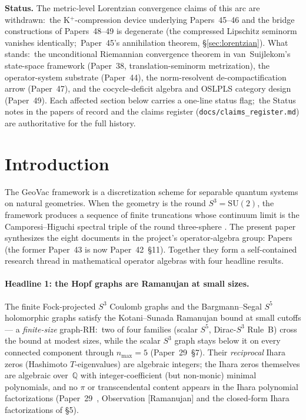 \documentclass[11pt,a4paper]{article}
\theoremstyle{plain}
\theoremstyle{definition}
\newcommand{\nmax}{n_{\max}}
\newcommand{\sthree}{S^{3}}
\newcommand{\sfive}{S^{5}}
\newcommand{\SU}{\mathrm{SU}}
\begin{document}
\bigskip\noindent\textbf{Status.}  The metric-level Lorentzian
convergence claims of this arc are withdrawn:\ the
K$^{+}$-compression device underlying Papers~45--46 and the bridge
constructions of Papers~48--49 is degenerate (the compressed
Lipschitz seminorm vanishes identically;\ Paper~45's annihilation
theorem, \S\ref{sec:lorentzian}).  What stands:\ the unconditional
Riemannian convergence theorem in van~Suijlekom's state-space
framework (Paper~38, translation-seminorm metrization), the
operator-system substrate (Paper~44), the norm-resolvent
de-compactification arrow (Paper~47), and the cocycle-deficit
algebra and OSLPLS category design (Paper~49).  Each affected
section below carries a one-line status flag;\ the Status notes in
the papers of record and the claims register
(\texttt{docs/claims\_register.md}) are authoritative for the full
history.

\section{Introduction}
\label{sec:intro}

The GeoVac framework is a discretization scheme for separable quantum
systems on natural geometries.  When the geometry is the round
$\sthree = \SU(2)$, the framework produces a sequence of finite
truncations whose continuum limit is the Camporesi--Higuchi
spectral triple of the round three-sphere
\cite{camporesi_higuchi1996}.  The present paper synthesizes the eight
documents in the project's operator-algebra group:
Papers~\cite{paper29,paper32,paper38,paper39,paper40_unified,paper42,paper44,paper45}
(the former Paper~43 is now Paper~42~\S 11).
Together they form a self-contained research thread in mathematical
operator algebras with four headline results.

\paragraph{Headline 1: the Hopf graphs are Ramanujan at small sizes.}
The finite Fock-projected $\sthree$ Coulomb graphs and the
Bargmann--Segal $\sfive$ holomorphic graphs satisfy the
Kotani--Sunada Ramanujan bound at small cutoffs --- a \emph{finite-size}
graph-RH:\ two of four families (scalar $\sfive$, Dirac-$\sthree$
Rule~B) cross the bound at modest sizes, while the scalar $\sthree$
graph stays below it on every connected component through
$\nmax = 5$ (Paper~29~\S7).  Their \emph{reciprocal} Ihara
zeros (Hashimoto $T$-eigenvalues) are algebraic integers; the Ihara
zeros themselves are algebraic over~$\mathbb{Q}$ with integer-coefficient
(but non-monic) minimal polynomials, and no $\pi$ or transcendental
content appears in the Ihara polynomial factorizations
(Paper~29~\cite{paper29}, Observation [Ramanujan] and the closed-form
Ihara factorizations of \S5).
\end{document}
